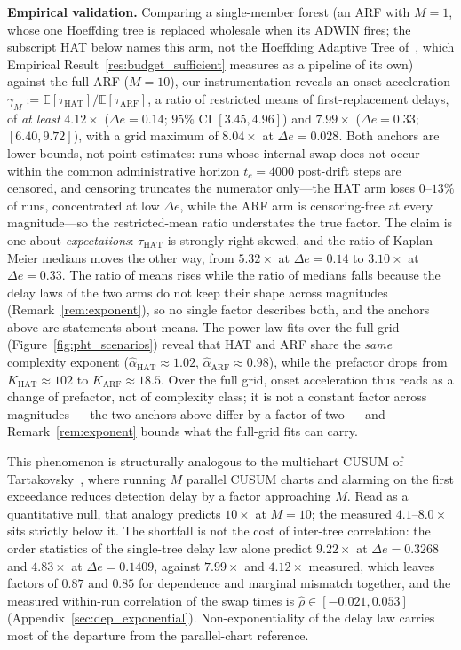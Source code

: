 \documentclass[smallextended]{svjour3}
\begin{document}
\textbf{Empirical validation.}
Comparing a single-member forest (an ARF with $M = 1$, whose one Hoeffding tree is replaced wholesale when its ADWIN fires; the subscript HAT below names this arm, not the Hoeffding Adaptive Tree of~\cite{bifet_hat_2009}, which Empirical Result~\ref{res:budget_sufficient} measures as a pipeline of its own) against the full ARF ($M = 10$), our instrumentation reveals an onset acceleration $\gamma_M := \mathbb{E}[\tau_{\mathrm{HAT}}] / \mathbb{E}[\tau_{\mathrm{ARF}}]$, a ratio of restricted means of first-replacement delays, of \emph{at least} $4.12\times$ ($\Delta e = 0.14$; $95\%$ CI $[3.45, 4.96]$) and $7.99\times$ ($\Delta e = 0.33$; $[6.40, 9.72]$), with a grid maximum of $8.04\times$ at $\Delta e = 0.028$. Both anchors are lower bounds, not point estimates: runs whose internal swap does not occur within the common administrative horizon $t_c = 4000$ post-drift steps are censored, and censoring truncates the numerator only---the HAT arm loses $0$--$13\%$ of runs, concentrated at low $\Delta e$, while the ARF arm is censoring-free at every magnitude---so the restricted-mean ratio understates the true factor. The claim is one about \emph{expectations}: $\tau_{\mathrm{HAT}}$ is strongly right-skewed, and the ratio of Kaplan--Meier medians moves the other way, from $5.32\times$ at $\Delta e = 0.14$ to $3.10\times$ at $\Delta e = 0.33$. The ratio of means rises while the ratio of medians falls because the delay laws of the two arms do not keep their shape across magnitudes (Remark~\ref{rem:exponent}), so no single factor describes both, and the anchors above are statements about means. The power-law fits over the full grid (Figure~\ref{fig:pht_scenarios}) reveal that HAT and ARF share the \emph{same} complexity exponent ($\hat\alpha_{\mathrm{HAT}} \approx 1.02$, $\hat\alpha_{\mathrm{ARF}} \approx 0.98$), while the prefactor drops from $K_{\mathrm{HAT}} \approx 102$ to $K_{\mathrm{ARF}} \approx 18.5$. Over the full grid, onset acceleration thus reads as a change of prefactor, not of complexity class; it is not a constant factor across magnitudes --- the two anchors above differ by a factor of two --- and Remark~\ref{rem:exponent} bounds what the full-grid fits can carry.

This phenomenon is structurally analogous to the multichart CUSUM of Tartakovsky~\cite{tartakovsky_2005_multichart}, where running $M$ parallel CUSUM charts and alarming on the first exceedance reduces detection delay by a factor approaching $M$. Read as a quantitative null, that analogy predicts $10\times$ at $M = 10$; the measured $4.1$--$8.0\times$ sits strictly below it. The shortfall is not the cost of inter-tree correlation: the order statistics of the single-tree delay law alone predict $9.22\times$ at $\Delta e = 0.3268$ and $4.83\times$ at $\Delta e = 0.1409$, against $7.99\times$ and $4.12\times$ measured, which leaves factors of $0.87$ and $0.85$ for dependence and marginal mismatch together, and the measured within-run correlation of the swap times is $\hat\rho \in [-0.021, 0.053]$ (Appendix~\ref{sec:dep_exponential}). Non-exponentiality of the delay law carries most of the departure from the parallel-chart reference.
\end{document}
